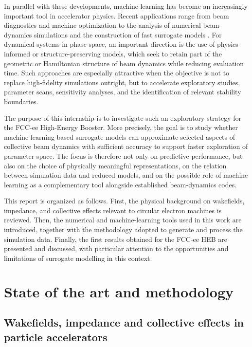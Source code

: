 \documentclass[11pt,a4paper]{article}
\begin{document}
\begin{sloppypar}
In parallel with these developments, machine learning has become an increasingly important tool in accelerator physics. Recent applications range from beam diagnostics and machine optimization to the analysis of numerical beam-dynamics simulations and the construction of fast surrogate models \cite{arpaia_machine_2021}. For dynamical systems in phase space, an important direction is the use of physics-informed or structure-preserving models, which seek to retain part of the geometric or Hamiltonian structure of beam dynamics while reducing evaluation time. Such approaches are especially attractive when the objective is not to replace high-fidelity simulations outright, but to accelerate exploratory studies, parameter scans, sensitivity analyses, and the identification of relevant stability boundaries.

The purpose of this internship is to investigate such an exploratory strategy for the FCC-ee High-Energy Booster. More precisely, the goal is to study whether machine-learning-based surrogate models can approximate selected aspects of collective beam dynamics with sufficient accuracy to support faster exploration of parameter space. The focus is therefore not only on predictive performance, but also on the choice of physically meaningful representations, on the relation between simulation data and reduced models, and on the possible role of machine learning as a complementary tool alongside established beam-dynamics codes.

This report is organized as follows. First, the physical background on wakefields, impedance, and collective effects relevant to circular electron machines is reviewed. Then, the numerical and machine-learning tools used in this work are introduced, together with the methodology adopted to generate and process the simulation data. Finally, the first results obtained for the FCC-ee HEB are presented and discussed, with particular attention to the opportunities and limitations of surrogate modelling in this context.


\section{State of the art and methodology}

\subsection{Wakefields, impedance and collective effects in particle accelerators}


\end{sloppypar}
\end{document}
